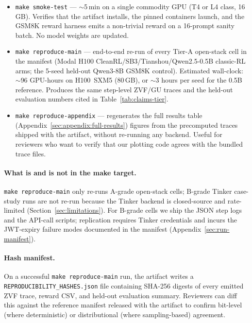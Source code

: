 \documentclass{article}
\begin{document}
\begin{itemize}\setlength\itemsep{1pt}
  \item \texttt{make smoke-test} --- $\sim$5\,min on a single commodity
        GPU (T4 or L4 class, 16\,GB). Verifies that the artifact installs,
        the pinned containers launch, and the GSM8K reward harness emits a
        non-trivial reward on a 16-prompt sanity batch. No model weights are
        updated.
  \item \texttt{make reproduce-main} --- end-to-end re-run of every Tier-A
        open-stack cell in the manifest (Modal H100
        CleanRL/SB3/Tianshou/Qwen2.5-0.5B classic-RL arms; the 5-seed
        held-out Qwen3-8B GSM8K control). Estimated wall-clock:
        $\sim$96 GPU-hours on H100~SXM5 (80\,GB), or
        $\sim$3 hours per seed for the 0.5B reference. Produces the same
        step-level ZVF/GU traces and the held-out evaluation numbers cited
        in Table~\ref{tab:claims-tier}.
  \item \texttt{make reproduce-appendix} --- regenerates the full results
        table (Appendix~\ref{sec:appendix:full-results}) figures from the
        precomputed traces shipped with the artifact, without re-running
        any backend. Useful for reviewers who want to verify that our
        plotting code agrees with the bundled trace files.
\end{itemize}

\paragraph{What is and is not in the make target.}
\texttt{make reproduce-main} only re-runs A-grade open-stack cells; B-grade
Tinker case-study runs are not re-run because the Tinker backend is
closed-source and rate-limited (Section~\ref{sec:limitations}). For B-grade
cells we ship the JSON step logs and the API-call scripts; replication
requires Tinker credentials and incurs the JWT-expiry failure modes
documented in the manifest (Appendix~\ref{sec:run-manifest}).

\paragraph{Hash manifest.}
On a successful \texttt{make reproduce-main} run, the artifact writes a
\texttt{REPRODUCIBILITY\_HASHES.json} file containing SHA-256 digests of
every emitted ZVF trace, reward CSV, and held-out evaluation summary.
Reviewers can diff this against the reference manifest released with the
artifact to confirm bit-level (where deterministic) or distributional
(where sampling-based) agreement.
\end{document}
